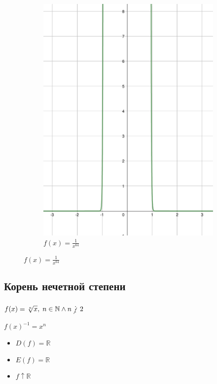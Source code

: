 \begin{figure}[h]
\begin{subfigure}{0.35\textwidth}
        \includegraphics[width=\textwidth]{tex/chapter_2/assets/y=1_div_by_x^64.pdf}
        \caption*{$f(x) = \frac{1}{x^{64}}$}
    \end{subfigure}
\end{figure}

\subsection{Корень нечетной степени}

$f(x) = \sqrt[n]{x}, \; n \in \mathbb{N} \land n \notdivisible 2$

\begin{remark}
    $f(x)^{-1} = x^n$
\end{remark}

\begin{itemize}
    \item $D(f) = \mathbb{R}$
    \item $E(f) = \mathbb{R}$
    \item $f \uparrow \mathbb{R}$
\end{itemize}

